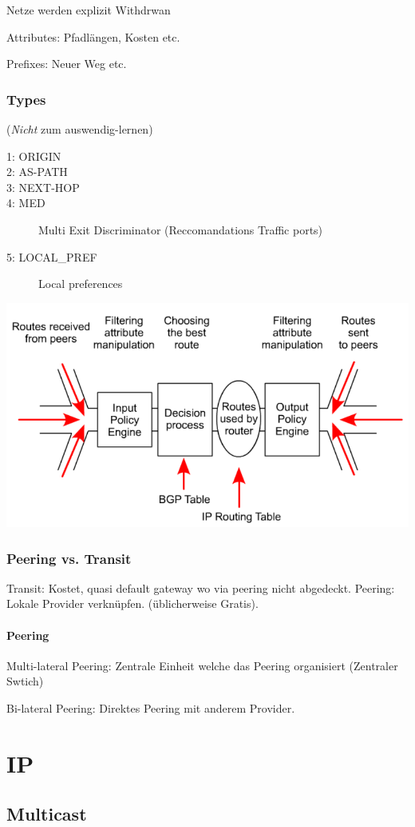 Netze werden explizit Withdrwan

Attributes: Pfadlängen, Kosten etc.

Prefixes: Neuer Weg etc.

\subsubsection{Types}
(\emph{Nicht} zum auswendig-lernen)
\begin{description}
	\item[1: ORIGIN]
	\item[2: AS-PATH]
	\item[3: NEXT-HOP]
	\item[4: MED] Multi Exit Discriminator (Reccomandations Traffic ports)
	\item[5: LOCAL\_PREF] Local preferences
\end{description}

\includegraphics[width=0.5\linewidth]{img/bgp_process_model.png}

\subsubsection{Peering vs. Transit}

Transit: Kostet, quasi default gateway wo via peering nicht abgedeckt.
Peering: Lokale Provider verknüpfen. (üblicherweise Gratis).

\paragraph{Peering}
Multi-lateral Peering: Zentrale Einheit welche das Peering organisiert (Zentraler Swtich)

Bi-lateral Peering: Direktes Peering mit anderem Provider.


\section{IP}

\subsection{Multicast}

